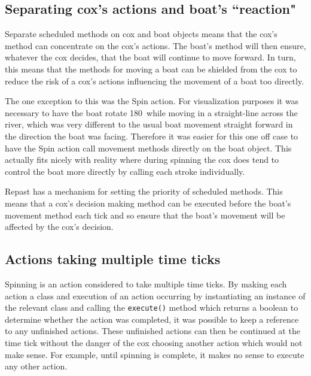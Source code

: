     \subsection{Separating cox's actions and boat's ``reaction"}
    Separate scheduled methods on cox and boat objects means that the cox's method can concentrate on the cox's actions. The boat's method will then ensure, whatever the cox decides, that the boat will continue to move forward. In turn, this means that the methods for moving a boat can be shielded from the cox to reduce the risk of a cox's actions influencing the movement of a boat too directly. 
    
    The one exception to this was the Spin action. For visualization purposes it was necessary to have the boat rotate 180\textdegree\ while moving in a straight-line across the river, which was very different to the usual boat movement straight forward in the direction the boat was facing. Therefore it was easier for this one off case to have the Spin action call movement methods directly on the boat object. This actually fits nicely with reality where during spinning the cox does tend to control the boat more directly by calling each stroke individually.

      Repast has a mechanism for setting the priority of scheduled methods. This means that a cox's decision making method can be executed before the boat's movement method each tick and so ensure that the boat's movement will be affected by the cox's decision.

      \subsection{Actions taking multiple time ticks}
      Spinning is an action considered to take multiple time ticks. By making each action a class and execution of an action occurring by instantiating an instance of the relevant class and calling the \texttt{execute()} method which returns a boolean to determine whether the action was completed, it was possible to keep a reference to any unfinished actions. These unfinished actions can then be continued at the time tick without the danger of the cox choosing another action which would not make sense. For example, until spinning is complete, it makes no sense to execute any other action.
  
